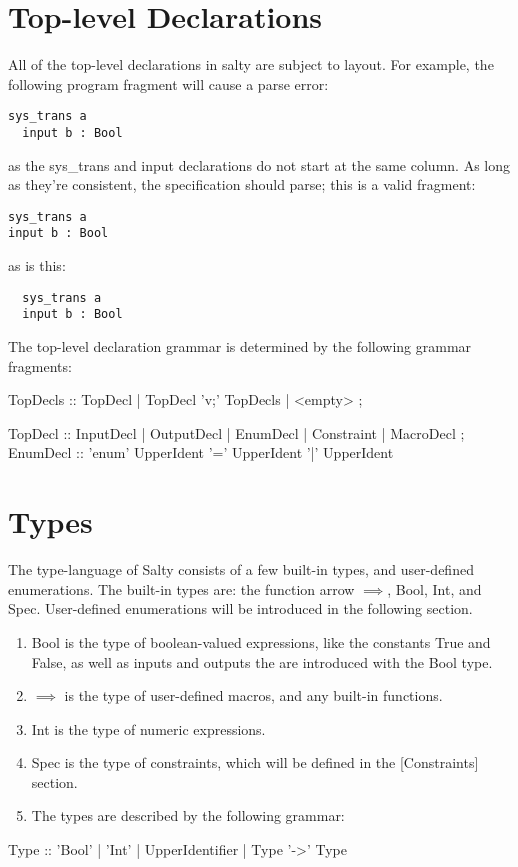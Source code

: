 \section{Top-level Declarations}

All of the top-level declarations in salty are subject to layout. For example, the following program fragment will cause a parse error:
\begin{lstlisting}
sys_trans a
  input b : Bool
\end{lstlisting}
\noindent as the sys\_trans and input declarations do not start at the same column. As long as they're consistent, the specification should parse; this is a valid fragment:
\begin{lstlisting}
sys_trans a
input b : Bool
\end{lstlisting}
\noindent as is this:
\begin{lstlisting}
  sys_trans a
  input b : Bool
\end{lstlisting}
\noindent The top-level declaration grammar is determined by the following grammar fragments:
\begin{Grammar}
  TopDecls :: TopDecl | TopDecl 'v;' TopDecls | <empty> ;

  TopDecl :: InputDecl | OutputDecl | EnumDecl
        | Constraint | MacroDecl ;
  EnumDecl :: 'enum' UpperIdent '=' UpperIdent { '|' UpperIdent }
\end{Grammar}

\section{Types}

The type-language of Salty consists of a few built-in types, and user-defined enumerations. The built-in types are: the function arrow $\implies$, Bool, Int, and Spec. User-defined enumerations will be introduced in the following section.
\begin{enumerate}
  \item Bool is the type of boolean-valued expressions, like the constants True and False, as well as inputs and outputs the are introduced with the Bool type.
  \item $\implies$ is the type of user-defined macros, and any built-in functions.
  \item Int is the type of numeric expressions.
  \item Spec is the type of constraints, which will be defined in the [Constraints] section.
  \item The types are described by the following grammar:
\end{enumerate}
\begin{Grammar}
  Type :: 'Bool' | 'Int' | UpperIdentifier | Type '->' Type
\end{Grammar}


